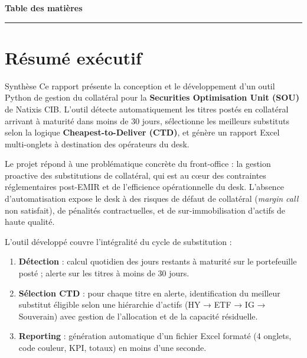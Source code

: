 \documentclass[12pt,a4paper]{article}
\begin{document}
\begin{titlepage}
\vfill

\noindent
\colorbox{natixisBlue}{%
  \makebox[\linewidth][c]{%
    \textcolor{white}{\small
      Projet réalisé dans le cadre d'un stage au sein de la Securities Optimisation Unit -- Natixis CIB%
    }%
  }%
}

\restoregeometry
\end{titlepage}

\newpage
\thispagestyle{fancy}
{\color{natixisBlue}\Large\bfseries Table des matières}\\[4pt]
{\color{natixisBlue}\rule{\linewidth}{1pt}}
\vspace{4pt}
\tableofcontents

\newpage

\section*{Résumé exécutif}

\begin{kpibox}{Synthèse}
Ce rapport présente la conception et le développement d'un outil Python de gestion du
collatéral pour la \textbf{Securities Optimisation Unit (SOU)} de Natixis CIB. L'outil
détecte automatiquement les titres postés en collatéral arrivant à maturité dans moins
de 30 jours, sélectionne les meilleurs substituts selon la logique \textbf{Cheapest-to-Deliver
(CTD)}, et génère un rapport Excel multi-onglets à destination des opérateurs du desk.
\end{kpibox}

\vspace{8pt}

Le projet répond à une problématique concrète du front-office : la gestion proactive
des substitutions de collatéral, qui est au cœur des contraintes réglementaires
post-EMIR et de l'efficience opérationnelle du desk. L'absence d'automatisation expose
le desk à des risques de défaut de collatéral (\textit{margin call} non satisfait),
de pénalités contractuelles, et de sur-immobilisation d'actifs de haute qualité.

\medskip

L'outil développé couvre l'intégralité du cycle de substitution :
\begin{enumerate}[leftmargin=*, label=\textbf{\arabic{*}.}]
  \item \textbf{Détection} : calcul quotidien des jours restants à maturité sur le
    portefeuille posté ; alerte sur les titres à moins de 30 jours.
  \item \textbf{Sélection CTD} : pour chaque titre en alerte, identification du
    meilleur substitut éligible selon une hiérarchie d'actifs (HY → ETF → IG → Souverain)
    avec gestion de l'allocation et de la capacité résiduelle.
  \item \textbf{Reporting} : génération automatique d'un fichier Excel formaté
    (4 onglets, code couleur, KPI, totaux) en moins d'une seconde.
\end{enumerate}
\end{document}
